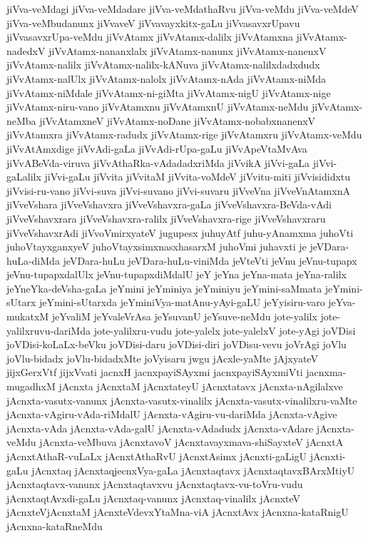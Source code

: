 {jiVva-veMdagi
jiVva-veMdadare
jiVva-veMdathaRvu
jiVva-veMdu
jiVva-veMdeV
jiVva-veMbudanunx
jiVvaveV
jiVvavayxkitx-gaLu
jiVvasavxrUpavu
jiVvasavxrUpa-veMdu
jiVvAtamx
jiVvAtamx-dalilx
jiVvAtamxna
jiVvAtamx-nadedxV
jiVvAtamx-nananxlalx
jiVvAtamx-nanunx
jiVvAtamx-nanenxV
jiVvAtamx-nalilx
jiVvAtamx-nalilx-kANuva
jiVvAtamx-nalilxdadxdudx
jiVvAtamx-nalUlx
jiVvAtamx-nalolx
jiVvAtamx-nAda
jiVvAtamx-niMda
jiVvAtamx-niMdale
jiVvAtamx-ni-giMta
jiVvAtamx-nigU
jiVvAtamx-nige
jiVvAtamx-niru-vano
jiVvAtamxnu
jiVvAtamxnU
jiVvAtamx-neMdu
jiVvAtamx-neMba
jiVvAtamxneV
jiVvAtamx-noDane
jiVvAtamx-nobabxnanenxV
jiVvAtamxra
jiVvAtamx-radudx
jiVvAtamx-rige
jiVvAtamxru
jiVvAtamx-veMdu
jiVvAtAmxdige
jiVvAdi-gaLa
jiVvAdi-rUpa-gaLu
jiVvApeVtaMvAva
jiVvABeVda-viruva
jiVvAthaRka-vAdadadxriMda
jiVvikA
jiVvi-gaLa
jiVvi-gaLalilx
jiVvi-gaLu
jiVvita
jiVvitaM
jiVvita-voMdeV
jiVvitu-miti
jiVvisididxtu
jiVvisi-ru-vano
jiVvi-suva
jiVvi-suvano
jiVvi-suvaru
jiVveVna
jiVveVnAtamxnA
jiVveVshara
jiVveVshavxra
jiVveVshavxra-gaLa
jiVveVshavxra-BeVda-vAdi
jiVveVshavxrara
jiVveVshavxra-ralilx
jiVveVshavxra-rige
jiVveVshavxraru
jiVveVshavxrAdi
jiVvoVmirxyateV
jugupesx
juhuyAtf
juhu-yAnamxma
juhoVti
juhoVtayxganxyeV
juhoVtayxsimxnasxhasarxM
juhoVmi
juhavxti
je
jeVDara-huLa-diMda
jeVDara-huLu
jeVDara-huLu-viniMda
jeVteVti
jeVnu
jeVnu-tupapx
jeVnu-tupapxdalUlx
jeVnu-tupapxdiMdalU
jeY
jeYna
jeYna-mata
jeYna-ralilx
jeYneYka-deVsha-gaLa
jeYmini
jeYminiya
jeYminiyu
jeYmini-saMmata
jeYmini-sUtarx
jeYmini-sUtarxda
jeYminiVya-matAnu-yAyi-gaLU
jeYyisiru-varo
jeYva-mukatxM
jeYvaliM
jeYvaleVrAsa
jeYsuvanU
jeYsuve-neMdu
jote-yalilx
jote-yalilxruvu-dariMda
jote-yalilxru-vudu
jote-yalelx
jote-yalelxV
jote-yAgi
joVDisi
joVDisi-koLaLx-beVku
joVDisi-daru
joVDisi-diri
joVDisu-vevu
joVrAgi
joVlu
joVlu-bidadx
joVlu-bidadxMte
joVyisaru
jwgu
jAcxle-yaMte
jAjxyateV
jijxGerxVtf
jijxVvati
jacnxH
jacnxpayiSAyxmi
jacnxpayiSAyxmiVti
jacnxma-mugadhxM
jAcnxta
jAcnxtaM
jAcnxtateyU
jAcnxtatavx
jAcnxta-nAgilalxve
jAcnxta-vasutx-vanunx
jAcnxta-vasutx-vinalilx
jAcnxta-vasutx-vinalilxru-vaMte
jAcnxta-vAgiru-vAda-riMdalU
jAcnxta-vAgiru-vu-dariMda
jAcnxta-vAgive
jAcnxta-vAda
jAcnxta-vAda-galU
jAcnxta-vAdadudx
jAcnxta-vAdare
jAcnxta-veMdu
jAcnxta-veMbuva
jAcnxtavoV
jAcnxtavayxmava-shiSayxteV
jAcnxtA
jAcnxtAthaR-vuLaLx
jAcnxtAthaRvU
jAcnxtAsimx
jAcnxti-gaLigU
jAcnxti-gaLu
jAcnxtaq
jAcnxtaqjecnxVya-gaLa
jAcnxtaqtavx
jAcnxtaqtavxBArxMtiyU
jAcnxtaqtavx-vanunx
jAcnxtaqtavxvu
jAcnxtaqtavx-vu-toVru-vudu
jAcnxtaqtAvxdi-gaLu
jAcnxtaq-vanunx
jAcnxtaq-vinalilx
jAcnxteV
jAcnxteVjAcnxtaM
jAcnxteVdevxYtaMna-viA
jAcnxtAvx
jAcnxna-kataRnigU
jAcnxna-kataRneMdu
}
